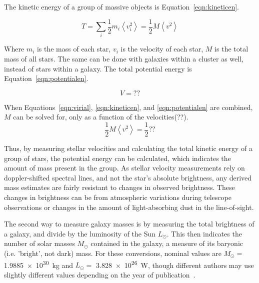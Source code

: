     The kinetic energy of a group of massive objects is Equation~\ref{eqn:kineticen}.
    
    \begin{equation}\label{eqn:kineticen}
      T = \sum_i \frac{1}{2} m_i \left \langle v_i^2 \right \rangle = \frac{1}{2} M \left \langle v^2 \right \rangle
    \end{equation}
    
    Where $m_i$ is the mass of each star, $v_i$ is the velocity of each star, $M$ is the total mass of all stars.
    The same can be done with galaxies within a cluster as well, instead of stars within a galaxy.
    The total potential energy is Equation~\ref{eqn:potentialen}.

    \begin{equation}\label{eqn:potentialen}
      V = ??
    \end{equation}
    
    When Equations~\ref{eqn:virial}, \ref{eqn:kineticen}, and \ref{eqn:potentialen} are combined, $M$ can be solved for, only as a function of the velocities{\color{red}(??)}.
    \begin{equation}\label{eqn:virial_combined}
      \frac{1}{2} M \left \langle v^2 \right \rangle = \frac{1}{2} ??
    \end{equation}
    
    Thus, by measuring stellar velocities and calculating the total kinetic energy of a group of stars, the potential energy can be calculated, which indicates the amount of mass present in the group.
    As stellar velocity measurements rely on doppler-shifted spectral lines, and not the star's absolute brightness, any derived mass estimates are fairly resistant to changes in observed brightness.
    These changes in brightness can be from atmospheric variations during telescope observations or changes in the amount of light-absorbing dust in the line-of-sight.

    The second way to measure galaxy masses is by measuring the total brightness of a galaxy, and divide by the luminosity of the Sun $L_\odot$.
    This then indicates the number of solar masses $M_\odot$ contained in the galaxy, a measure of its baryonic (i.e. 'bright', not dark) mass.
    For these conversions, nominal values are $M_\odot =$ \SI{1.9885e30}{kg} and $L_\odot =$ \SI{3.828e26}{W}, though different authors may use slightly different values depending on the year of publication~\cite{iau_solarconstants}.
    
